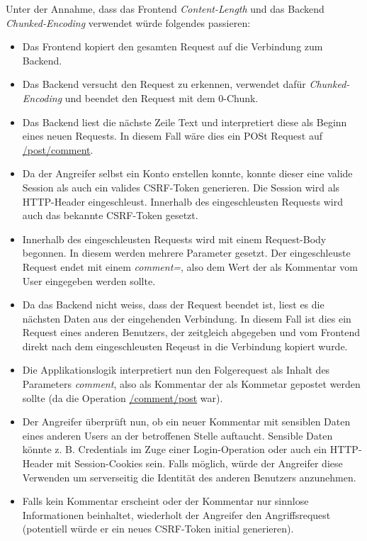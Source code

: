Unter der Annahme, dass das Frontend \textit{Content-Length} und das Backend \textit{Chunked-Encoding} verwendet würde folgendes passieren:
\begin{itemize}
	\item Das Frontend kopiert den gesamten Request auf die Verbindung zum Backend.
	\item Das Backend versucht den Request zu erkennen, verwendet dafür \textit{Chunked-Encoding} und beendet den Request mit dem 0-Chunk.
	\item Das Backend liest die nächste Zeile Text und interpretiert diese als Beginn eines neuen Requests. In diesem Fall wäre dies ein POSt Request auf \url{/post/comment}.
	\item Da der Angreifer selbst ein Konto erstellen konnte, konnte dieser eine valide Session als auch ein valides CSRF-Token generieren. Die Session wird als HTTP-Header eingeschleust. Innerhalb des eingeschleusten Requests wird auch das bekannte CSRF-Token gesetzt.
	\item Innerhalb des eingeschleusten Requests wird mit einem Request-Body begonnen. In diesem werden mehrere Parameter gesetzt. Der eingeschleuste Request endet mit einem \textit{comment=}, also dem Wert der als Kommentar vom User eingegeben werden sollte.
	\item Da das Backend nicht weiss, dass der Request beendet ist, liest es die nächsten Daten aus der eingehenden Verbindung. In diesem Fall ist dies ein Request eines anderen Benutzers, der zeitgleich abgegeben und vom Frontend direkt nach dem eingeschleusten Reqeust in die Verbindung kopiert wurde.
	\item Die Applikationslogik interpretiert nun den Folgerequest als Inhalt des Parameters \textit{comment}, also als Kommentar der als Kommetar gepostet werden sollte (da die Operation \url{/comment/post} war).
	\item Der Angreifer überprüft nun, ob ein neuer Kommentar mit sensiblen Daten eines anderen Users an der betroffenen Stelle auftaucht. Sensible Daten könnte z. B. Credentials im Zuge einer Login-Operation oder auch ein HTTP-Header mit Session-Cookies sein. Falls möglich, würde der Angreifer diese Verwenden um serverseitig die Identität des anderen Benutzers anzunehmen.
	\item Falls kein Kommentar erscheint oder der Kommentar nur sinnlose Informationen beinhaltet, wiederholt der Angreifer den Angriffsrequest (potentiell würde er ein neues CSRF-Token initial generieren).
\end{itemize}

